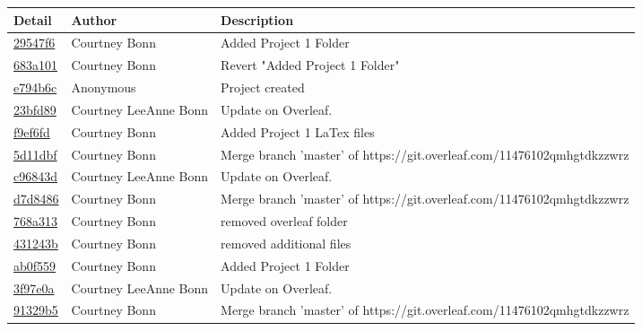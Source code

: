 \begin{tabular}{l l l}\textbf{Detail} & \textbf{Author} & \textbf{Description}\\\hline
\href{https://github.com/courtbonn/CS-444/commit/29547f64718379356bd13263071a531bdd0896b5}{29547f6} & Courtney Bonn & Added Project 1 Folder\\\hline
\href{https://github.com/courtbonn/CS-444/commit/683a101800f08d0bcd4492d65d8829d25f488f21}{683a101} & Courtney Bonn & Revert "Added Project 1 Folder"\\\hline
\href{https://github.com/courtbonn/CS-444/commit/e794b6c0aad9a13a17177922b6ff415d677495b5}{e794b6c} & Anonymous & Project created\\\hline
\href{https://github.com/courtbonn/CS-444/commit/23bfd89f069e99232fe59b7730f7625cbf29fa44}{23bfd89} & Courtney LeeAnne Bonn & Update on Overleaf.\\\hline
\href{https://github.com/courtbonn/CS-444/commit/f9ef6fd2b923276b21d789c4caba0985800d1515}{f9ef6fd} & Courtney Bonn & Added Project 1 LaTex files\\\hline
\href{https://github.com/courtbonn/CS-444/commit/5d11dbfd983f4c3f1911da1797a2be0fae8bf2cf}{5d11dbf} & Courtney Bonn & Merge branch 'master' of https://git.overleaf.com/11476102qmhgtdkzzwrz\\\hline
\href{https://github.com/courtbonn/CS-444/commit/c96843d51fef0558071c08e6256c3020fd84a999}{c96843d} & Courtney LeeAnne Bonn & Update on Overleaf.\\\hline
\href{https://github.com/courtbonn/CS-444/commit/d7d8486bd31847448e59f0803e792d6ea53e516a}{d7d8486} & Courtney Bonn & Merge branch 'master' of https://git.overleaf.com/11476102qmhgtdkzzwrz\\\hline
\href{https://github.com/courtbonn/CS-444/commit/768a313b027c8be433190f3d92ee1d3f8d69daad}{768a313} & Courtney Bonn & removed overleaf folder\\\hline
\href{https://github.com/courtbonn/CS-444/commit/431243b6da2468a84fa6ef1b39b6490ea81620a0}{431243b} & Courtney Bonn & removed additional files\\\hline
\href{https://github.com/courtbonn/CS-444/commit/ab0f559ed2890ba06230c459c2b1b96a8f69ac6a}{ab0f559} & Courtney Bonn & Added Project 1 Folder\\\hline
\href{https://github.com/courtbonn/CS-444/commit/3f97e0af2ade6dd51b96d8d9cfd751fb70deff0d}{3f97e0a} & Courtney LeeAnne Bonn & Update on Overleaf.\\\hline
\href{https://github.com/courtbonn/CS-444/commit/91329b56b14c2eb1d1058f3f3275215813b83e6c}{91329b5} & Courtney Bonn & Merge branch 'master' of https://git.overleaf.com/11476102qmhgtdkzzwrz\\\hline

\end{tabular}
